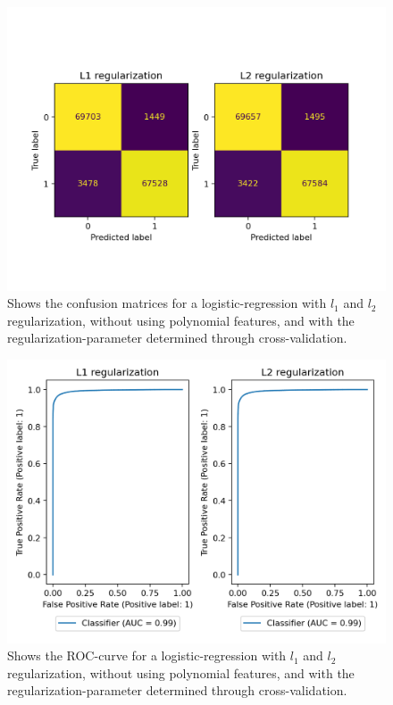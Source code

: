 \documentclass{article}
\begin{document}
\begin{figure}
	\centering
	\includegraphics[scale=0.8]{lr_confusion_mat}
	\caption{Shows the confusion matrices for a logistic-regression with $l_1$
		and $l_2$ regularization, without using polynomial features, and with the
		regularization-parameter determined through cross-validation.}
	\label{lrconfusionmats}
\end{figure}

\begin{figure}
	\centering
	\includegraphics[scale=0.8]{lr_roc_curve}
	\caption{Shows the ROC-curve for a logistic-regression with $l_1$ and $l_2$
		regularization, without using polynomial features, and with the
		regularization-parameter determined through cross-validation.}
	\label{lrroccurves}
\end{figure}
\end{document}
